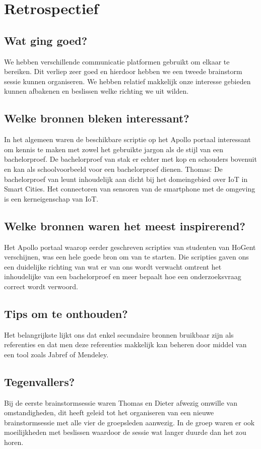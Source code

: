 \documentclass[fleqn,10pt]{voorstel}
\begin{document}
\section{Retrospectief}
\subsection{Wat ging goed?}
We hebben verschillende communicatie platformen gebruikt om elkaar te bereiken. Dit verliep zeer goed en hierdoor hebben we een tweede brainstorm sessie kunnen organiseren.
We hebben relatief makkelijk onze interesse gebieden kunnen afbakenen en beslissen welke richting we uit wilden.
\subsection{Welke bronnen bleken interessant?}
In het algemeen waren de beschikbare scriptie op het Apollo portaal interessant om kennis te maken met zowel het gebruikte jargon als de stijl van een bachelorproef. De bachelorproef \cite{VanderPlaetsen2013} van stak er echter met kop en schouders bovenuit en kan als schoolvoorbeeld voor een bachelorproef dienen.
Thomas: De bachelorproef van \cite{VanderPlaetsen2013} leunt inhoudelijk aan dicht bij het domeingebied over IoT in Smart Cities. Het connectoren van sensoren van de smartphone met de omgeving is een kerneigenschap van IoT.
\subsection{Welke bronnen waren het meest inspirerend?}
Het Apollo portaal waarop eerder geschreven scripties van studenten van HoGent verschijnen, was een hele goede bron om van te starten. Die scripties gaven ons een duidelijke richting van wat er van ons wordt verwacht omtrent het inhoudelijke van een bachelorproef en meer bepaalt hoe een onderzoeksvraag correct wordt verwoord. 
\subsection{Tips om te onthouden?}
Het belangrijkste lijkt ons dat enkel secundaire bronnen bruikbaar zijn als referenties en dat men deze referenties makkelijk kan beheren door middel van een tool zoals Jabref of Mendeley.
\subsection{Tegenvallers?}
Bij de eerste brainstormsessie waren Thomas en Dieter afwezig omwille van omstandigheden, dit heeft geleid tot het organiseren van een nieuwe brainstormsessie met alle vier de groepsleden aanwezig. In de groep waren er ook moeilijkheden met beslissen waardoor de sessie wat langer duurde dan het zou horen.
\end{document}
